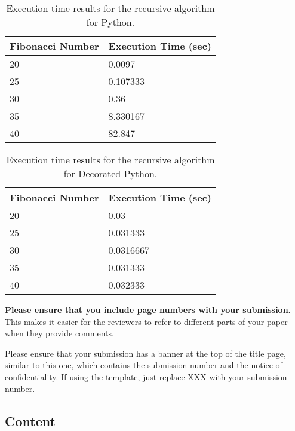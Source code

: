 \documentclass{sig-alternate}
\begin{document}
\begin{scriptsize}
\begin{table}[ht!]
  \centering
  \begin{tabular}{|l|l|}
    \hline
    \textbf{Fibonacci Number} & \textbf{Execution Time (sec)}\\
    \hline
    20 & 0.0097\\
    \hline
    25 & 0.107333\\
	\hline
	30 & 0.36\\
	\hline
	35 & 8.330167\\
	\hline
	40 & 82.847\\
	\hline
\end{tabular}
\caption{Execution time results for the recursive algorithm for Python.}
\label{table:formatting}
\end{table}
\end{scriptsize}

\begin{scriptsize}
\begin{table}[ht!]
  \centering
  \begin{tabular}{|l|l|}
    \hline
    \textbf{Fibonacci Number} & \textbf{Execution Time (sec)}\\
    \hline
    20 & 0.03\\
    \hline
    25 & 0.031333\\
	\hline
	30 & 0.0316667\\
	\hline
	35 & 0.031333\\
	\hline
	40 & 0.032333\\
	\hline
\end{tabular}
\caption{Execution time results for the recursive algorithm for Decorated Python.}
\label{table:formatting}
\end{table}
\end{scriptsize}

\textbf{Please ensure that you include page numbers with your
submission}. This makes it easier for the reviewers to refer to different
parts of your paper when they provide comments.

Please ensure that your submission has a banner at the top of the
title page, similar to
\href{http://hpca2018.ece.ucsb.edu/docs/hpca24.pdf}{this one},
which contains the submission number and the notice of
confidentiality.  If using the template, just replace XXX with your
submission number.

\subsection{Content}
\end{document}
